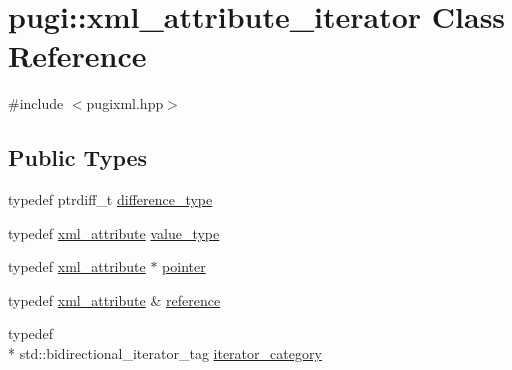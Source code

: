 \hypertarget{classpugi_1_1xml__attribute__iterator}{\section{pugi\-:\-:xml\-\_\-attribute\-\_\-iterator Class Reference}
\label{classpugi_1_1xml__attribute__iterator}
}


{\ttfamily \#include $<$pugixml.\-hpp$>$}

\subsection*{Public Types}
\begin{DoxyCompactItemize}
\item 
typedef ptrdiff\-\_\-t \hyperlink{classpugi_1_1xml__attribute__iterator_a00b3eecf2aba886a673ad2319be88618}{difference\-\_\-type}
\item 
typedef \hyperlink{classpugi_1_1xml__attribute}{xml\-\_\-attribute} \hyperlink{classpugi_1_1xml__attribute__iterator_a2b0e779f12de813d7a806056ebed8907}{value\-\_\-type}
\item 
typedef \hyperlink{classpugi_1_1xml__attribute}{xml\-\_\-attribute} $\ast$ \hyperlink{classpugi_1_1xml__attribute__iterator_a6ed6fb3197abb02ffa848ad6b9b7a1be}{pointer}
\item 
typedef \hyperlink{classpugi_1_1xml__attribute}{xml\-\_\-attribute} \& \hyperlink{classpugi_1_1xml__attribute__iterator_ade97045a1217d0a7897e5f5873297117}{reference}
\item 
typedef \\*
std\-::bidirectional\-\_\-iterator\-\_\-tag \hyperlink{classpugi_1_1xml__attribute__iterator_aad988273a3e4cdc5fa3eb879dbdc8d35}{iterator\-\_\-category}
\end{DoxyCompactItemize}
